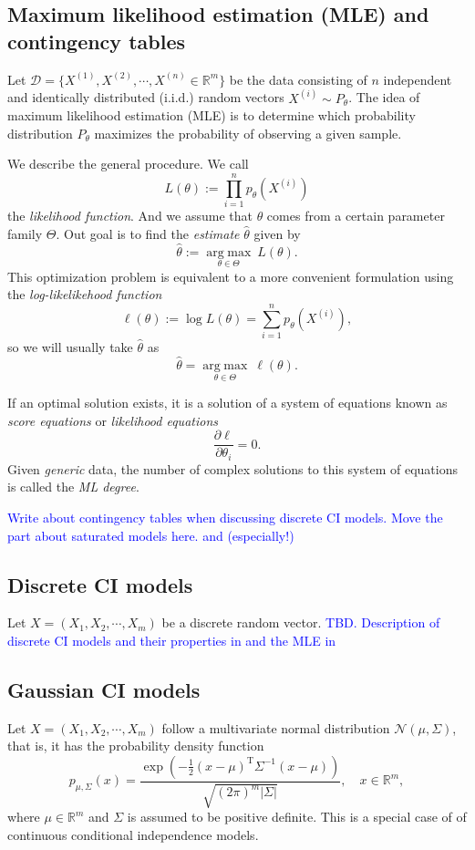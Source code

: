 \documentclass[10pt,a4paper]{article}
\begin{document}
\subsection{Maximum likelihood estimation (MLE) and contingency tables}
Let $\mathcal{D}=\{X^{(1)},X^{(2)},\cdots,X^{(n)} \in \mathbb{R}^m\}$ be the data consisting of $n$ independent and identically distributed (i.i.d.) random vectors $X^{(i)}\sim P_\theta$. The idea of maximum likelihood estimation (MLE) is to determine which probability distribution $P_\theta$ maximizes the probability of observing a given sample. 

We describe the general procedure. We call
\[L(\theta):=\prod_{i=1}^np_\theta(X^{(i)})\]
the \emph{likelihood function}. And we assume that $\theta$ comes from a certain parameter family $\Theta$. Out goal is to find the \emph{estimate} $\hat{\theta}$ given by
\[\hat{\theta} := \underset{\theta\in\Theta}{\operatorname{arg\;max}}\ L(\theta).\]
This optimization problem is equivalent to a more convenient formulation using the \emph{log-likelikehood function}
\begin{equation}\label{log-likelihood function}
\ell(\theta):= \log L(\theta)=\sum_{i=1}^np_\theta(X^{(i)}),
\end{equation}
so we will usually take $\hat{\theta}$ as
\begin{equation}\label{optimization problem}
\hat{\theta} = \underset{\theta\in\Theta}{\operatorname{arg\;max}}\ \ell(\theta).
\end{equation}


If an optimal solution exists, it is a solution of a system of equations known as \emph{score equations} or \emph{likelihood equations}
\[\frac{\partial \ell}{\partial \theta_i}=0.\]
Given \emph{generic} data, the number of complex solutions to this system of equations is called the \emph{ML degree}.

\textcolor{blue}{Write about contingency tables when discussing discrete CI models. Move the part about saturated models here. \cite[Chapter 1]{drton2008lectures} and (especially!) \cite[p.69]{lauritzen1996graphical}}
\subsection{Discrete CI models}
Let $X=(X_1,X_2,\cdots,X_m)$ be a discrete random vector.
\textcolor{blue}{TBD. Description of discrete CI models and their properties in \cite[pp. 70-73]{drton2008lectures} and the MLE in \cite[pp. 36-43]{drton2008lectures}}
\subsection{Gaussian CI models}
Let $X=(X_1,X_2,\cdots,X_m)$ follow a multivariate normal distribution $\mathcal{N}(\mu,\Sigma)$, that is, it has the probability density function
\[p_{\mu,\Sigma}(x) = \frac{\exp\left(-\frac 1 2 ({ x}-{\mu})^\mathrm{T}{\Sigma}^{-1}({x}-{\mu})\right)}{\sqrt{(2\pi)^m|\Sigma|}}, \quad x \in \mathbb{R}^m,\]
where $\mu \in \mathbb{R}^m$ and $\Sigma$ is assumed to be positive definite. This is a special case of of continuous conditional independence models.
\end{document}
